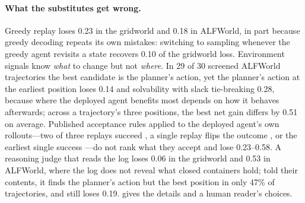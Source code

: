 \documentclass{article}
\theoremstyle{plain}
\theoremstyle{definition}
\theoremstyle{remark}
\begin{document}
\paragraph{What the substitutes get wrong.}
Greedy replay loses 0.23 in the gridworld and 0.18 in ALFWorld, in part because greedy decoding repeats its own mistakes: switching to sampling whenever the greedy agent revisits a state recovers 0.10 of the gridworld loss. Environment signals know \emph{what} to change but not \emph{where}. In 29 of 30 screened ALFWorld trajectories the best candidate is the planner's action, yet the planner's action at the earliest position loses 0.14 and solvability with slack tie-breaking 0.28, because where the deployed agent benefits most depends on how it behaves afterwards; across a trajectory's three positions, the best net gain differs by 0.51 on average. Published acceptance rules applied to the deployed agent's own rollouts---two of three replays succeed \citep{ma2025dover}, a single replay flips the outcome \citep{bonagiri2026causalflow}, or the earliest single success \citep{zhang2025agentracer}---do not rank what they accept and lose 0.23--0.58. A reasoning judge that reads the log loses 0.06 in the gridworld and 0.53 in ALFWorld, where the log does not reveal what closed containers hold; told their contents, it finds the planner's action but the best position in only 47\% of trajectories, and still loses 0.19.  gives the details and a human reader's choices.
\end{document}
